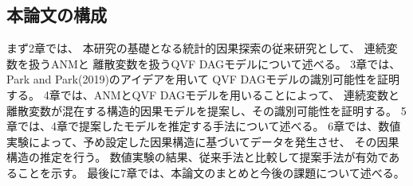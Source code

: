 
\subsection{本論文の構成}

まず2章では、
本研究の基礎となる統計的因果探索の従来研究として、
連続変数を扱うANMと
離散変数を扱うQVF DAGモデルについて述べる。
3章では、Park and Park(2019)\cite{Park2019-qy}のアイデアを用いて
QVF DAGモデルの識別可能性を証明する。
4章では、ANMとQVF DAGモデルを用いることによって、
連続変数と離散変数が混在する構造的因果モデルを提案し、その識別可能性を証明する。
5章では、4章で提案したモデルを推定する手法について述べる。
6章では、数値実験によって、予め設定した因果構造に基づいてデータを発生させ、
その因果構造の推定を行う。
数値実験の結果、従来手法と比較して提案手法が有効であることを示す。
最後に7章では、本論文のまとめと今後の課題について述べる。
